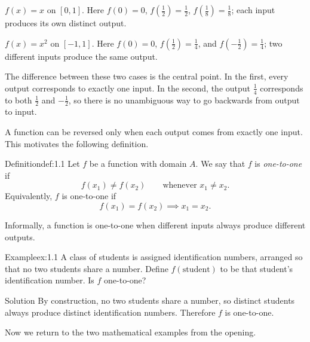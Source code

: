 \documentclass[a4paper,12pt,oneside]{memoir}
\begin{document}
\begin{warmuplist}
  \item \(f(x) = x\) on \([0, 1]\). Here \(f(0) = 0\), \(f(\tfrac{1}{2}) = \tfrac{1}{2}\), \(f(\tfrac{1}{8}) = \tfrac{1}{8}\); each input produces its own distinct output.
  \item \(f(x) = x^{2}\) on \([-1, 1]\). Here \(f(0) = 0\), \(f(\tfrac{1}{2}) = \tfrac{1}{4}\), and \(f(-\tfrac{1}{2}) = \tfrac{1}{4}\); two different inputs produce the same output.
\end{warmuplist}
The difference between these two cases is the central point. In the first, every output corresponds to exactly one input. In the second, the output \(\tfrac{1}{4}\) corresponds to both \(\tfrac{1}{2}\) and \(-\tfrac{1}{2}\), so there is no unambiguous way to go backwards from output to input.

A function can be reversed only when each output comes from exactly one input. This motivates the following definition.

\begin{envdefinition}{Definition}{def:1.1}{}
Let \(f\) be a function with domain \(A\). We say that \(f\) is \emph{one-to-one} if \[ f(x_{1}) \neq f(x_{2}) \qquad \text{whenever } x_{1} \neq x_{2}. \] Equivalently, \(f\) is one-to-one if \[ f(x_{1}) = f(x_{2}) \implies x_{1} = x_{2}. \]

\begin{informal}
Informally, a function is one-to-one when different inputs always produce different outputs.
\end{informal}
\end{envdefinition}
\begin{workedexample}
\begin{envexample}{Example}{ex:1.1}{}
A class of students is assigned identification numbers, arranged so that no two students share a number. Define \(f(\mathrm{student})\) to be that student’s identification number. Is \(f\) one-to-one?
\end{envexample}
\begin{envsolution}{Solution}{}{}
By construction, no two students share a number, so distinct students always produce distinct identification numbers. Therefore \(f\) is one-to-one.
\end{envsolution}
\end{workedexample}
Now we return to the two mathematical examples from the opening.
\end{document}
